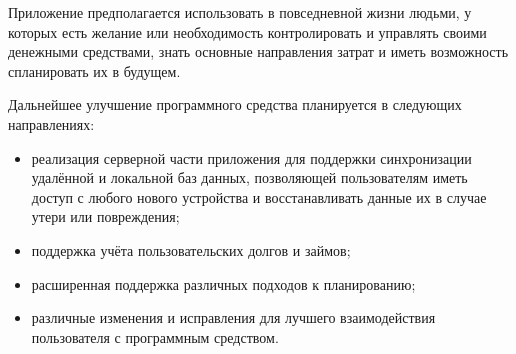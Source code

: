 Приложение предполагается использовать в повседневной жизни людьми, у которых есть желание или необходимость контролировать и управлять своими денежными средствами, знать основные направления затрат и иметь возможность спланировать их в будущем.

Дальнейшее улучшение программного средства планируется в следующих направлениях:
\begin{itemize}
    \item реализация серверной части приложения для поддержки синхронизации удалённой и локальной баз данных, позволяющей пользователям иметь доступ с любого нового устройства и восстанавливать данные их в случае утери или повреждения;
    \item поддержка учёта пользовательских долгов и займов;
    \item расширенная поддержка различных подходов к планированию;
    \item различные изменения и исправления для лучшего взаимодействия пользователя с программным средством.
\end{itemize}